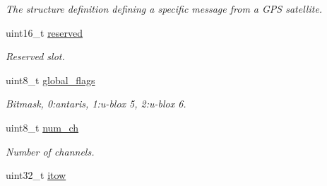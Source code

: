 \begin{DoxyCompactItemize}
{\begin{tabbing}
{{{{{{{\end{tabbing}\begin{DoxyCompactList}\small\item\em The structure definition defining a specific message from a G\+P\+S satellite. \end{DoxyCompactList}\item 
\hypertarget{structubx__nav__sv__info__t_a960d66cb5f501fa0b484fbb40ffee988}{uint16\+\_\+t \hyperlink{structubx__nav__sv__info__t_a960d66cb5f501fa0b484fbb40ffee988}{reserved}}\label{structubx__nav__sv__info__t_a960d66cb5f501fa0b484fbb40ffee988}

\begin{DoxyCompactList}\small\item\em Reserved slot. \end{DoxyCompactList}\item 
\hypertarget{structubx__nav__sv__info__t_a4f6be11008e81dcc8c64c9f69681ba11}{uint8\+\_\+t \hyperlink{structubx__nav__sv__info__t_a4f6be11008e81dcc8c64c9f69681ba11}{global\+\_\+flags}}\label{structubx__nav__sv__info__t_a4f6be11008e81dcc8c64c9f69681ba11}

\begin{DoxyCompactList}\small\item\em Bitmask, 0\+:antaris, 1\+:u-\/blox 5, 2\+:u-\/blox 6. \end{DoxyCompactList}\item 
\hypertarget{structubx__nav__sv__info__t_a59fc3d45ef9667a0b7c8ebcc93d6c9f5}{uint8\+\_\+t \hyperlink{structubx__nav__sv__info__t_a59fc3d45ef9667a0b7c8ebcc93d6c9f5}{num\+\_\+ch}}\label{structubx__nav__sv__info__t_a59fc3d45ef9667a0b7c8ebcc93d6c9f5}

\begin{DoxyCompactList}\small\item\em Number of channels. \end{DoxyCompactList}\item 
\hypertarget{structubx__nav__sv__info__t_a02a7186f7953c4256db55825de4232b8}{uint32\+\_\+t \hyperlink{structubx__nav__sv__info__t_a02a7186f7953c4256db55825de4232b8}{itow}}\label{structubx__nav__sv__info__t_a02a7186f7953c4256db55825de4232b8}

}
\end{DoxyCompactItemize}
